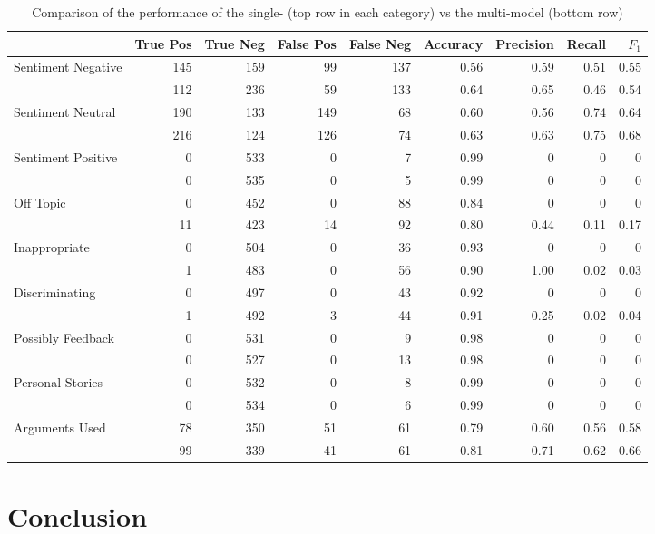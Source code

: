 \documentclass[11pt,a4paper]{article}
\begin{document}
\begin{table}
	\centering\small
	\begin{tabular}{l r r r r r r r r}
		& True Pos & True Neg & False Pos & False Neg & Accuracy & Precision & Recall & $F_1$ \\
		\hline
		Sentiment Negative & 145 & 159 & 99 & 137 & 0.56 & 0.59 & 0.51 & 0.55 \\
		& 112 & 236 & 59 & 133 & 0.64 & 0.65 & 0.46 & 0.54 \\
		\hline
		Sentiment Neutral & 190 & 133 & 149 & 68 & 0.60 & 0.56 & 0.74 & 0.64 \\
		& 216 & 124 & 126 & 74 & 0.63 & 0.63 & 0.75 & 0.68 \\
		\hline
		Sentiment Positive & 0 & 533 & 0 & 7 & 0.99 & 0 & 0 & 0 \\
		& 0 & 535 & 0 & 5 & 0.99 & 0 & 0 & 0 \\
		\hline
		Off Topic & 0 & 452 & 0 & 88 & 0.84 & 0 & 0 & 0 \\
		& 11 & 423 & 14 & 92 & 0.80 & 0.44 & 0.11 & 0.17 \\
		\hline
		Inappropriate & 0 & 504 & 0 & 36 & 0.93 & 0 & 0 & 0 \\
		& 1 & 483 & 0 & 56 & 0.90 & 1.00 & 0.02 & 0.03 \\
		\hline
		Discriminating & 0 & 497 & 0 & 43 & 0.92 & 0 & 0 & 0 \\
		& 1 & 492 & 3 & 44 & 0.91 & 0.25 & 0.02 & 0.04 \\
		\hline
		Possibly Feedback & 0 & 531 & 0 & 9 & 0.98 & 0 & 0 & 0 \\
		& 0 & 527 & 0 & 13 & 0.98 & 0 & 0 & 0 \\
		\hline
		Personal Stories & 0 & 532 & 0 & 8 & 0.99 & 0 & 0 & 0 \\
		& 0 & 534 & 0 & 6 & 0.99 & 0 & 0 & 0 \\
		\hline
		Arguments Used & 78 & 350 & 51 & 61 & 0.79 & 0.60 & 0.56 & 0.58\\
		& 99 & 339 & 41 & 61 & 0.81 & 0.71 & 0.62 & 0.66 \\
	\end{tabular}
	\caption{Comparison of the performance of the single- (top row in each category) vs the multi-model (bottom row)}
	\label{tab:results}
\end{table}


\section{Conclusion}





\appendix

\end{document}
